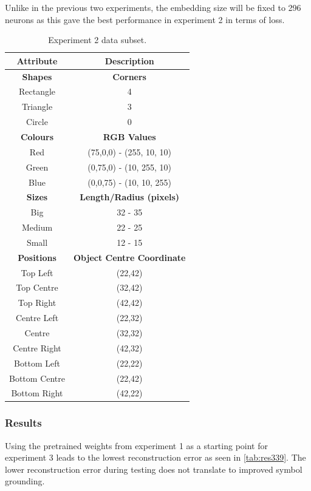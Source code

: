 Unlike in the previous two experiments, the embedding size will be fixed to 296 neurons as this gave the best performance in experiment 2 in terms of loss.


\begin{table}[h]
\centering
\begin{tabular}{|c|c|}
\hline
\textbf{Attribute} & \textbf{Description} \\ \hline \hline
\textbf{Shapes} & \textbf{Corners} \\ \hline
Rectangle & 4\\ \hline
Triangle & 3\\ \hline
Circle & 0\\ \hline 

\textbf{Colours} & \textbf{RGB Values}	\\ \hline	
Red & (75,0,0) - (255, 10, 10)\\ \hline
Green  & (0,75,0) - (10, 255, 10)\\ \hline
Blue   & (0,0,75) - (10, 10, 255)\\ \hline

\textbf{Sizes} & 	\textbf{Length/Radius (pixels)} \\ \hline			  
Big    & 32 - 35  \\ \hline
Medium & 22 - 25 \\ \hline
Small  & 12 - 15 \\ \hline 

\textbf{Positions} & \textbf{Object Centre Coordinate}	\\ \hline					  
Top Left & (22,42)\\ \hline	
Top Centre & (32,42)\\ \hline
Top Right & (42,42)\\ \hline
Centre Left &(22,32)\\ \hline
Centre & (32,32)\\ \hline
Centre Right &(42,32)\\ \hline
Bottom Left & (22,22)\\ \hline
Bottom Centre & (22,42)\\ \hline
Bottom Right & (42,22)\\ \hline				
\end{tabular}
\caption{Experiment 2 data subset.}
\label{tab:exp3_data} 
\end{table}

\subsubsection{Results}
Using the pretrained weights from experiment 1 as a starting point for experiment 3 leads to the lowest reconstruction error as seen in \autoref{tab:res339}. The lower reconstruction error during testing does not translate to improved symbol grounding.

